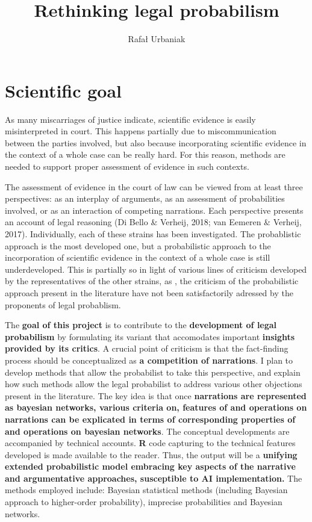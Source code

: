 \documentclass[11pt,dvipsnames,enabledeprecatedfontcommands]{scrartcl}
\title{Rethinking legal probabilism}
\author{Rafał Urbaniak}
\date{}
\begin{document}
\maketitle

\tableofcontents

\thispagestyle{empty}

\section{Scientific goal}\label{scientific-goal}


As many miscarriages of justice indicate, scientific evidence is easily
misinterpreted in court. This happens partially due to miscommunication
between the parties involved, but also because incorporating scientific
evidence in the context of a whole case can be really hard. For this
reason, methods are needed to support proper assessment of evidence in
such contexts.

The assessment of evidence in the court of law can be viewed from at
least three perspectives: as an interplay of arguments, as an assessment
of probabilities involved, or as an interaction of competing narrations.
Each perspective presents an account of legal reasoning (Di Bello \&
Verheij, 2018; van Eemeren \& Verheij, 2017). Individually, each of
these strains has been investigated. The probablistic approach is the
most developed one, but a probabilistic approach to the incorporation of
scientific evidence in the context of a whole case is still
underdeveloped. This is partially so in light of various lines of
criticism developed by the representatives of the other strains, as ,
the criticism of the probabilistic approach present in the literature
have not been satisfactorily adressed by the proponents of legal
probablism.

The \textbf{goal of this project} is to contribute to the
\textbf{development of legal probabilism} by formulating its variant
that accomodates important \textbf{insights provided by its critics}. A
crucial point of criticism is that the fact-finding process should be
conceptualized as \textbf{a competition of narrations}. I plan to
develop methods that allow the probabilist to take this perspective, and
explain how such methods allow the legal probabilist to address various
other objections present in the literature. The key idea is that once
\textbf{narrations are represented as bayesian networks, various criteria on,  features of  and operations on narrations can be explicated in terms of corresponding properties of and operations on bayesian networks}.
The conceptual developments are accompanied by technical accounts.
\textbf{\textsf{R}} code capturing to the technical features developed
is made available to the reader. Thus, the output will be a
\textbf{unifying extended probabilistic model embracing key aspects of the narrative and argumentative approaches, susceptible to AI implementation.}
The methods employed include: Bayesian statistical methods (including
Bayesian approach to higher-order probability), imprecise probabilities
and Bayesian networks.
\end{document}
